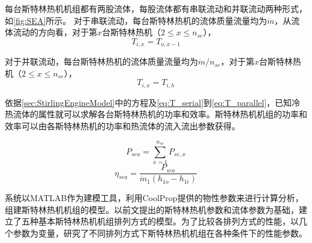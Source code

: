 每台斯特林热机机组都有两股流体，每股流体都有串联流动和并联流动两种形式，如\autoref{fig:SEA}所示。
对于串联流动，每台斯特林热机的流体质量流量均为$\dot{m}$，从流体流动的方向看，对于第$x$台斯特林热机（$2\leqslant{}x\leqslant{}n_{se}$），
\begin{equation}
	T_{i,x} = T_{o,x-1}
	\label{eq:T_serial}
\end{equation}

对于并联流动，每台斯特林热机的流体质量流量均为$\dot{m}/n_{se}$，对于第$x$台斯特林热机（$2\leqslant{}x\leqslant{}n_{se}$），
\begin{equation}
	T_{i,x} = T_{i,h}
	\label{eq:T_parallel}
\end{equation}

依据\autoref{sec:StirlingEngineModel}中的方程及\autoref{eq:T_serial}到\autoref{eq:T_parallel}，已知冷热流体的属性就可以求解各台斯特林热机的功率和效率。斯特林热机机组的功率和效率可以由各斯特林热机的功率和热流体的流入流出参数获得。

\begin{equation}
	P_{sea} = \sum_{x = 1}^{n_{se}}P_{se,x}
\end{equation}
\begin{equation}
	\eta_{sea} = \dfrac{P_{sea}}{\dot{m}_1(h_{1o} - h_{1i})}
\end{equation}

系统以MATLAB作为建模工具，利用CoolProp提供的物性参数来进行计算分析，组建斯特林热机机组的模型。以前文提出的斯特林热机参数和流体参数为基础，建立了五种基本斯特林热机机组排列方式的模型。为了比较各排列方式的性能，以几个参数为变量，研究了不同排列方式下斯特林热机机组在各种条件下的性能参数。

